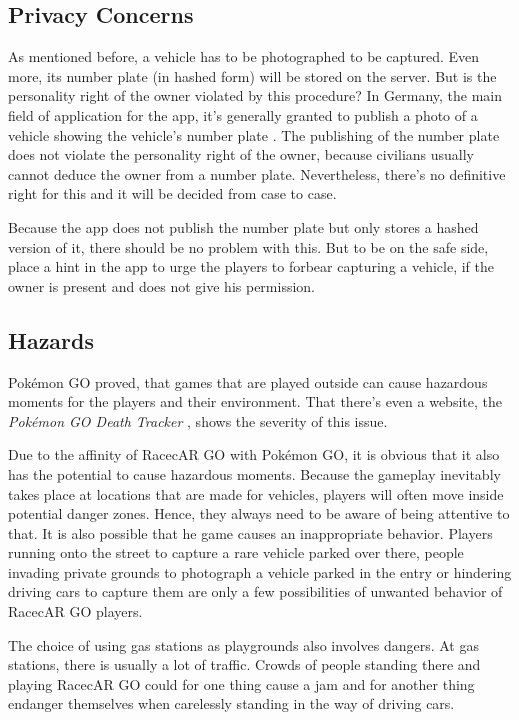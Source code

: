 \subsection{Privacy Concerns}
As mentioned before, a vehicle has to be photographed to be captured. Even more, its number plate (in hashed form) will be stored on the server. But is the personality right of the owner violated by this procedure? In Germany, the main field of application for the app, it's generally granted to publish a photo of a vehicle showing the vehicle's number plate \citep{recht}. The publishing of the number plate does not violate the personality right of the owner, because civilians usually cannot deduce the owner from a number plate. Nevertheless, there's no definitive right for this and it will be decided from case to case.

Because the app does not publish the number plate but only stores a hashed version of it, there should be no problem with this. But to be on the safe side, place a hint in the app to urge the players to forbear capturing a vehicle, if the owner is present and does not give his permission.

\subsection{Hazards}\label{sec:hazards}
Pok\'{e}mon GO proved, that games that are played outside can cause hazardous moments for the players and their environment. That there's even a website, the \emph{Pok\'{e}mon GO Death Tracker} \citep{PokemonGoDeathTracker}, shows the severity of this issue.

Due to the affinity of RacecAR GO with Pok\'{e}mon GO, it is obvious that it also has the potential to cause hazardous moments. Because the gameplay inevitably takes place at locations that are made for vehicles, players will often move inside potential danger zones. Hence, they always need to be aware of being attentive to that. It is also possible that he game causes an inappropriate behavior. Players running onto the street to capture a rare vehicle parked over there, people invading private grounds to photograph a vehicle parked in the entry or hindering driving cars to capture them are only a few possibilities of unwanted behavior of RacecAR GO players.

The choice of using gas stations as playgrounds also involves dangers. At gas stations, there is usually a lot of traffic. Crowds of people standing there and playing RacecAR GO could for one thing cause a jam and for another thing endanger themselves when carelessly standing in the way of driving cars.

